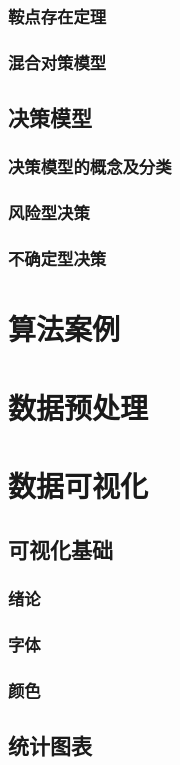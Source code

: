 \documentclass[openany]{progbookcn}
\begin{document}
\section{鞍点存在定理}
\section{混合对策模型}

\chapter{决策模型}
\section{决策模型的概念及分类}
\section{风险型决策}
\section{不确定型决策}

\part{算法案例}

\part{数据预处理}
\part{数据可视化}
\chapter{可视化基础}
\section{绪论}
\section{字体}
\section{颜色}
\chapter{统计图表}
\end{document}
